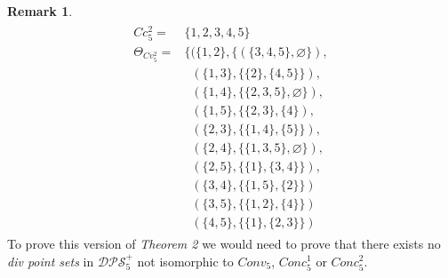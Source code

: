 \documentclass[11pt, oneside]{article}      %
\theoremstyle{definition}
\numberwithin{equation}{section}
\newtheorem*{remark}{Remark}
\theoremstyle{c}
\begin{document}
\begin{remark}
\begin{gather}
{\begin{split}
    Cc_5^2 = &\{1,2,3,4,5\} \\
     \Theta_{Cv_5^2} = & \{(\{1,2\},\{(\{3,4,5\},\varnothing\}), \\
    &\;\; (\{1,3\},\{\{2\},\{4,5\}\}), \\
    &\;\; (\{1,4\},\{\{2,3,5\},\varnothing\}), \\
    &\;\; (\{1,5\},\{\{2,3\},\{4\}), \\
    &\;\; (\{2,3\},\{\{1,4\},\{5\}\}), \\
    &\;\; (\{2,4\},\{\{1,3,5\},\varnothing\}), \\
    &\;\; (\{2,5\},\{\{1\},\{3,4\}\}), \\
    &\;\; (\{3,4\}, \{\{1,5\},\{2\}\}) \\
    &\;\; (\{3,5\}, \{\{1,2\},\{4\}\}) \\
    &\;\; (\{4,5\}, \{\{1\},\{2,3\}\}) \end{split}
 }
\end{gather}
To prove this version of \textit{Theorem 2} we would need to prove that there exists no \textit{div point sets} in $\mathscr{DPS}^+_5$ not isomorphic to $Conv_5$, $Conc_5^1$ or $Conc_5^2$.
\end{remark}
\end{document}
